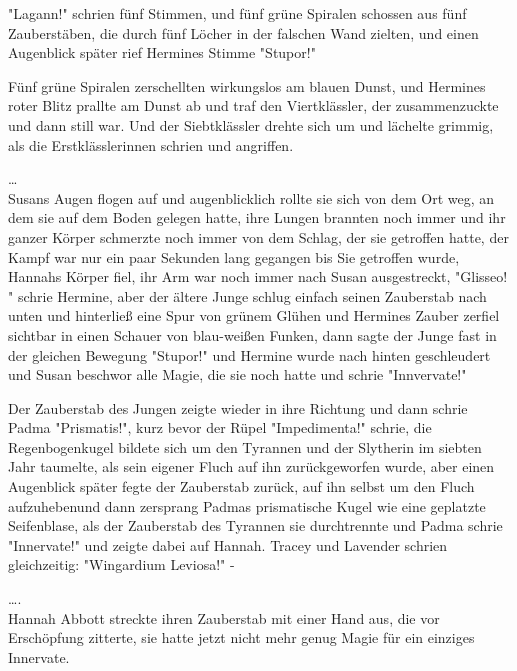 {"Lagann!" schrien fünf Stimmen, und fünf grüne Spiralen schossen aus fünf Zauberstäben, die durch fünf Löcher in der falschen Wand zielten, und einen Augenblick später rief Hermines Stimme "Stupor!"

Fünf grüne Spiralen zerschellten wirkungslos am blauen Dunst, und Hermines roter Blitz prallte am Dunst ab und traf den Viertklässler, der zusammenzuckte und dann still war. Und der Siebtklässler drehte sich um und lächelte grimmig, als die Erstklässlerinnen schrien und angriffen.

…\\ Susans Augen flogen auf und augenblicklich rollte sie sich von dem Ort weg, an dem sie auf dem Boden gelegen hatte, ihre Lungen brannten noch immer und ihr ganzer Körper schmerzte noch immer von dem Schlag, der sie getroffen hatte, der Kampf war nur ein paar Sekunden lang gegangen bis Sie getroffen wurde, Hannahs Körper fiel, ihr Arm war noch immer nach Susan ausgestreckt, "Glisseo! " schrie Hermine, aber der ältere Junge schlug einfach seinen Zauberstab nach unten und hinterließ eine Spur von grünem Glühen und Hermines Zauber zerfiel sichtbar in einen Schauer von blau-weißen Funken, dann sagte der Junge fast in der gleichen Bewegung "Stupor!" und Hermine wurde nach hinten geschleudert und Susan beschwor alle Magie, die sie noch hatte und schrie "Innvervate!"

Der Zauberstab des Jungen zeigte wieder in ihre Richtung und dann schrie Padma "Prismatis!", kurz bevor der Rüpel "Impedimenta!" schrie, die Regenbogenkugel bildete sich um den Tyrannen und der Slytherin im siebten Jahr taumelte, als sein eigener Fluch auf ihn zurückgeworfen wurde, aber einen Augenblick später fegte der Zauberstab zurück, auf ihn selbst um den Fluch aufzuhebenund dann zersprang Padmas prismatische Kugel wie eine geplatzte Seifenblase, als der Zauberstab des Tyrannen sie durchtrennte und Padma schrie "Innervate!" und zeigte dabei auf Hannah. Tracey und Lavender schrien gleichzeitig: "Wingardium Leviosa!" -

….\\ Hannah Abbott streckte ihren Zauberstab mit einer Hand aus, die vor Erschöpfung zitterte, sie hatte jetzt nicht mehr genug Magie für ein einziges Innervate.

}

